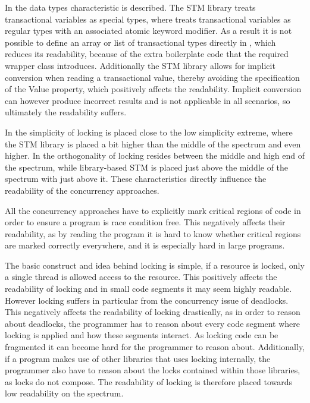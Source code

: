 In  the data types characteristic is described. The \ac{STM} library treats transactional variables as special types, where \stmname treats transactional variables as regular types with an associated atomic keyword modifier. As a result it is not possible to define an array or list of transactional types directly in \stmname, which reduces its readability, because of the extra boilerplate code that the required wrapper class introduces. Additionally the \ac{STM} library allows for implicit conversion when reading a transactional value, thereby avoiding the specification of the Value property, which positively affects the readability. Implicit conversion can however produce incorrect results and is not applicable in all scenarios, so ultimately the readability suffers.

In  the simplicity of locking is placed close to the low simplicity extreme, where the \ac{STM} library is placed a bit higher than the middle of the spectrum and \stmname even higher. In  the orthogonality of locking resides between the middle and high end of the spectrum, while library-based \ac{STM} is placed just above the middle of the spectrum with \stmname just above it. These characteristics directly influence the readability of the concurrency approaches.

All the concurrency approaches have to explicitly mark critical regions of code in order to ensure a program is race condition free. This negatively affects their readability, as by reading the program it is hard to know whether critical regions are marked correctly everywhere, and it is especially hard in large programs.

The basic  construct and idea behind locking is simple, if a resource is locked, only a single thread is allowed access to the resource. This positively affects the readability of locking and in small code segments it may seem highly readable. However locking suffers in particular from the concurrency issue of deadlocks. This negatively affects the readability of locking drastically, as in order to reason about deadlocks, the programmer has to reason about every code segment where locking is applied and how these segments interact. As locking code can be fragmented it can become hard for the programmer to reason about. Additionally, if a program makes use of other libraries that uses locking internally, the programmer also have to reason about the locks contained within those libraries, as locks do not compose. The readability of locking is therefore placed towards low readability on the spectrum.

